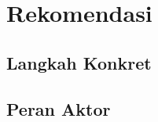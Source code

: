 \section{Rekomendasi}
\label{sec:rekomendasi}

\subsection{Langkah Konkret}

\subsection{Peran Aktor}
